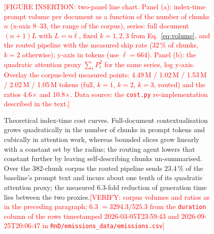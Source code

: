 \documentclass[pdflatex,sn-mathphys-num]{sn-jnl}
\newcommand{\todo}[1]{\textcolor{red}{#1}}
\newcommand{\verify}[1]{\todo{[VERIFY: #1]}}
\theoremstyle{thmstyleone}%
\theoremstyle{thmstylethree}%
\begin{document}
\begin{figure}[htbp]
  \centering
  \todo{[FIGURE INSERTION: two-panel line chart. Panel (a): index-time prompt volume per document as a function of the number of chunks $n$ (x-axis 8--33, the range of the corpus), series: full document $(n+1)L$ with $L=n\bar\ell$, fixed $k=1,2,3$ from Eq.~\eqref{eq:volume}, and the routed pipeline with the measured skip rate (32\,\% of chunks, $k=2$ otherwise); y-axis in tokens (use $\bar\ell=664$). Panel (b): the quadratic attention proxy $\sum_i P_i^2$ for the same series, log y-axis. Overlay the corpus-level measured points: 4.49\,M / 1.02\,M / 1.53\,M / 2.02\,M / 1.05\,M tokens (full, $k=1$, $k=2$, $k=3$, routed) and the ratios 4.6$\times$ and 10.8$\times$. Data source: the \texttt{cost.py} re-implementation described in the text.]}
  \caption{Theoretical index-time cost curves. Full-document contextualisation grows quadratically in the number of chunks in prompt tokens and cubically in attention work, whereas bounded slices grow linearly with a constant set by the radius; the routing agent lowers that constant further by leaving self-describing chunks un-summarised. Over the 382-chunk corpus the routed pipeline sends 23.4\,\% of the baseline's prompt text and incurs about one tenth of its quadratic attention proxy; the measured 6.3-fold reduction of generation time lies between the two proxies.\verify{corpus volumes and ratios as in the preceding paragraph; 6.3 $= 3294.3/525.3$ from the \texttt{duration} column of the rows timestamped 2026-03-05T23:59:43 and 2026-09-25T20:06:47 in \texttt{RnD/emissions\_data/emissions.csv}}}
  \label{fig:complexity}
\end{figure}
\end{document}
